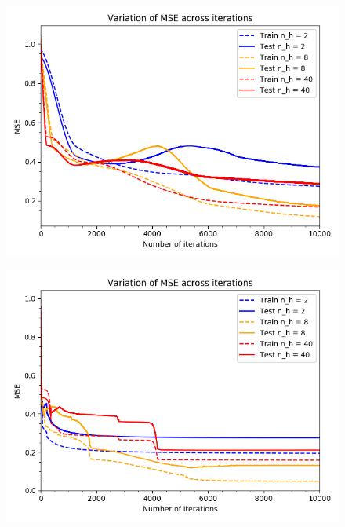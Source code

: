 \documentclass[a4paper]{article}
\begin{document}
\begin{enumerate}[label=(\alph*)]
\begin{itemize}
\begin{figure}[htp]
\begin{minipage}{0.4\textwidth}
  \includegraphics[scale=0.35]{plots/11d_adam.png}
  \label{plot_simple_nh2}
\end{minipage}
\hfill
\begin{minipage}{0.4\textwidth}
  \includegraphics[scale=0.35]{plots/11d_lbfgs.png}
  \label{plot_simple_nh8}
\end{minipage}
\end{figure}


\end{itemize}
\end{enumerate}
\end{document}
